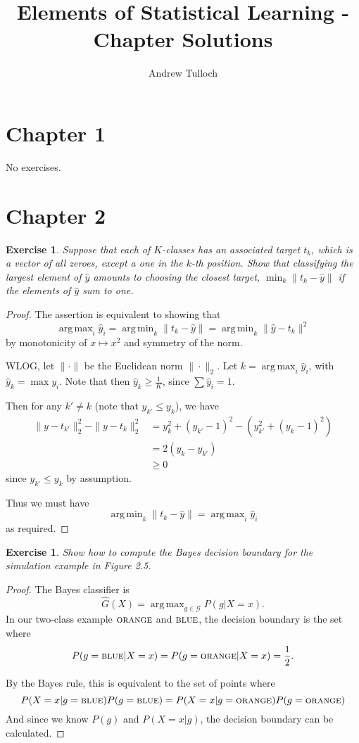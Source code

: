 \documentclass[12pt]{amsart}
\title{Elements of Statistical Learning - Chapter Solutions}								%
\author{Andrew Tulloch}
\theoremstyle{plain}%
\newtheorem{exer}[thm]{Exercise}
\theoremstyle{definition}
\theoremstyle{remark}
\DeclareMathOperator*{\argmax}{arg\,max}
\DeclareMathOperator*{\argmin}{arg\,min}
\begin{document}
\maketitle
\section{Chapter 1}

No exercises.

\section{Chapter 2}
\begin{exer}
    Suppose that each of $K$-classes has an associated target $t_k$, which is a vector of all zeroes, except a one in the $k$-th position.  Show that classifying the largest element of $\hat y$ amounts to choosing the closest target, $\min_k \| t_k - \hat y \|$ if the elements of $\hat y$ sum to one. 
\end{exer}
\begin{proof}
    The assertion is equivalent to showing that \[
    \argmax_i \hat y_i = \argmin_k \| t_k - \hat y \| = \argmin_k \|\hat y - t_k \|^2
\] by monotonicity of $x \mapsto x^2$ and symmetry of the norm.  

WLOG, let $\| \cdot \|$ be the Euclidean norm $\| \cdot \|_2$.  Let $k = \argmax_i \hat y_i$, with $\hat y_k = \max y_i$.  Note that then $\hat y_k \geq \frac{1}{K}$, since $\sum \hat y_i = 1$.   

Then for any $k' \neq k$ (note that $y_{k'} \leq y_k$), we have \begin{align*}
    \| y - t_{k'} \|_2^2 - \| y - t_k \|_2^2 &= y_k^2 + \left(y_{k'} - 1 \right)^2 - \left( y_{k'}^2 + \left(y_k - 1 \right)^2 \right) \\
    &= 2 \left(y_k - y_{k'}\right) \\
    &\geq 0
\end{align*} since $y_{k'} \leq y_k$ by assumption.

Thus we must have \[
    \argmin_k \| t_k - \hat y \| = \argmax_i \hat y_i
\] as required.    
\end{proof}

\begin{exer}
    Show how to compute the Bayes decision boundary for the simulation example in Figure 2.5.
\end{exer}
\begin{proof}
    The Bayes classifier is \[
        \hat G(X) = \argmax_{g \in \mathcal G} P(g | X = x ).
    \] In our two-class example $\textsc{orange}$ and $\textsc{blue}$, the decision boundary is the set where \[
        P(g=\textsc{blue} | X = x) = P(g =\textsc{orange} | X = x) = \frac{1}{2}.
    \]  
    
    By the Bayes rule, this is equivalent to the set of points where \[
        P(X = x | g = \textsc{blue}) P(g = \textsc{blue}) = P(X = x | g = \textsc{orange}) P(g = \textsc{orange})
    \] And since we know $P(g)$ and $P(X=x|g)$, the decision boundary can be calculated.
\end{proof}
    
\end{document}
